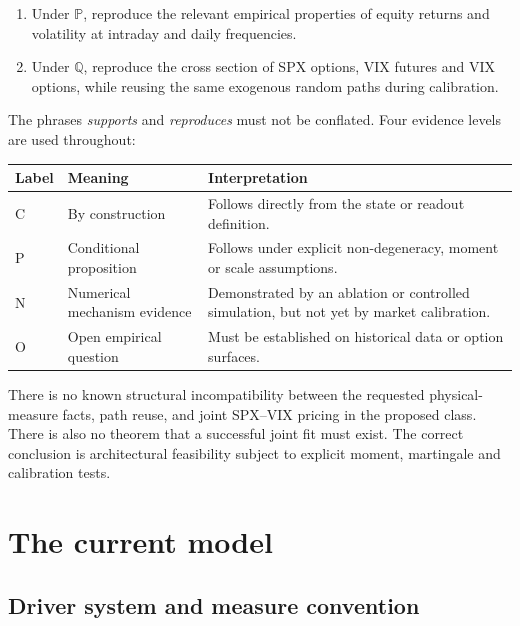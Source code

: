 \documentclass[11pt,a4paper]{article}
\newcommand{\Pp}{\mathbb{P}}
\newcommand{\Qq}{\mathbb{Q}}
\begin{document}
\begin{enumerate}
  \item Under \(\Pp\), reproduce the relevant empirical properties of equity returns and
  volatility at intraday and daily frequencies.
  \item Under \(\Qq\), reproduce the cross section of SPX options, VIX futures and VIX options,
  while reusing the same exogenous random paths during calibration.
\end{enumerate}

The phrases \emph{supports} and \emph{reproduces} must not be conflated. Four evidence levels
are used throughout:

\begin{center}
\begin{tabularx}{\textwidth}{@{}C{14mm}L{34mm}Y@{}}
\toprule
\textbf{Label} & \textbf{Meaning} & \textbf{Interpretation} \\
\midrule
C & By construction & Follows directly from the state or readout definition. \\
P & Conditional proposition & Follows under explicit non-degeneracy, moment or scale assumptions. \\
N & Numerical mechanism evidence & Demonstrated by an ablation or controlled simulation, but not yet by market calibration. \\
O & Open empirical question & Must be established on historical data or option surfaces. \\
\bottomrule
\end{tabularx}
\end{center}

\begin{resultbox}
There is no known structural incompatibility between the requested physical-measure facts,
path reuse, and joint SPX--VIX pricing in the proposed class. There is also no theorem that a
successful joint fit must exist. The correct conclusion is architectural feasibility subject
to explicit moment, martingale and calibration tests.
\end{resultbox}

\section{The current model}

\subsection{Driver system and measure convention}
\end{document}
